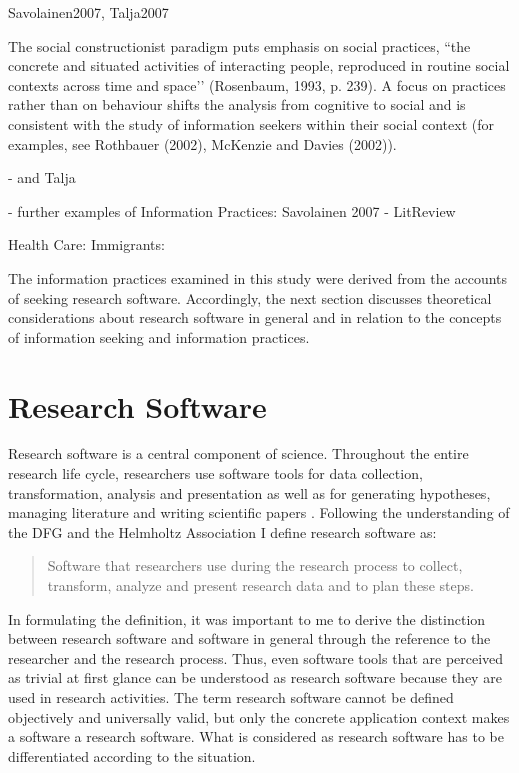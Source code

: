 \documentclass[12pt, a4paper, titlepage, oneside, abstract=true, toc=listof, toc=bibliography]{scrreprt}
\begin{document}
	Savolainen2007, Talja2007

The social constructionist paradigm puts emphasis on social practices, ``the concrete and situated activities of interacting people, reproduced in routine social contexts across time and space’’ (Rosenbaum, 1993, p. 239). A focus on practices rather than on behaviour shifts the analysis from cognitive to social and is consistent with the study of information seekers within their social context (for examples, see Rothbauer (2002), McKenzie and Davies (2002)).


- and Talja

- further examples of Information Practices: Savolainen 2007 - LitReview

Health Care: \citep{Kitzie2020}
Immigrants: \citep{Caidi2010}

The information practices examined in this study were derived from the accounts of seeking research software. Accordingly, the next section discusses theoretical considerations about research software in general and in relation to the concepts of information seeking and information practices. 

\section{Research Software}
\label{sec:R_SW}
Research software is a central component of science. Throughout the entire research life cycle, researchers use software tools for data collection, transformation, analysis and presentation as well as for generating hypotheses, managing literature and writing scientific papers \citep{Kethers2017, Pan2016, Wolski2017}.
Following the understanding of the \gls{DFG} \citep{Katerbow2018} and the Helmholtz Association \citep{Scheliga2019} I define research software as: 

\begin{quotation}
Software that researchers use during the research process to collect, transform, analyze and present research data and to plan these steps.
\end{quotation}

In formulating the definition, it was important to me to derive the distinction between research software and software in general through the reference to the researcher and the research process. Thus, even software tools that are perceived as trivial at first glance can be understood as research software because they are used in research activities. The term research software cannot be defined objectively and universally valid, but only the concrete application context makes a software a research software. What is considered as research software has to be differentiated according to the situation. 
\end{document}

